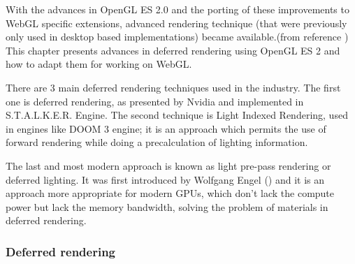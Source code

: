 With the advances in OpenGL ES 2.0 and the porting of these improvements to WebGL specific extensions, advanced rendering technique (that were previously only used in desktop based implementations) became available.(from reference \cite{engel14}) This chapter presents advances in deferred rendering using OpenGL ES 2 and how to adapt them for working on WebGL. 

There are 3 main deferred rendering techniques used in the industry. The first one is deferred rendering, as presented by Nvidia and implemented in S.T.A.L.K.E.R. Engine. The second technique is Light Indexed Rendering, used in engines like DOOM 3 engine; \cite{trebilco07} it is an approach which permits the use of forward rendering while doing a precalculation of lighting information.

The last and most modern approach is known as light pre-pass rendering or deferred lighting. It was first introduced by Wolfgang Engel (\cite{engel08}) and it is an approach more appropriate for modern GPUs, which don’t lack the compute power but lack the memory bandwidth, solving the problem of materials in deferred rendering.

\subsubsection{Deferred rendering}

